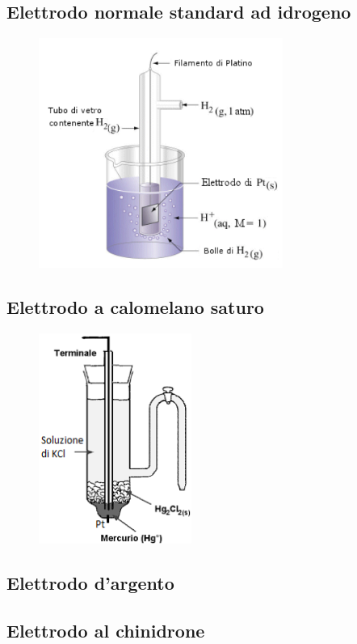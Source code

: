 \subsection{Elettrodo normale standard ad idrogeno}

\begin{figure}
    \centering
    \includegraphics[width=8cm]{immagini/Elettrodo_a_idrogeno.png}
\end{figure}
\subsection{Elettrodo a calomelano saturo}
\begin{figure}
    \centering
    \includegraphics[width=5cm]{immagini/Elettrodo_a_calomelano.png}
\end{figure}
\subsection{Elettrodo d'argento}
\subsection{Elettrodo al chinidrone}